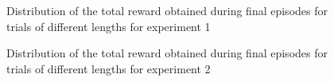 \documentclass[letterpaper]{article}
\begin{document}
\begin{figure}[h!]
	\centering
	\caption{Distribution of the total reward obtained during final episodes
	for trials of different lengths for experiment 1}
	\label{fig:distrib}
\end{figure}

\begin{figure}[h!]
	\centering
	\caption{Distribution of the total reward obtained during final episodes
	for trials of different lengths for experiment 2}
	\label{fig:distrib_cunseen}
\end{figure}
\end{document}

